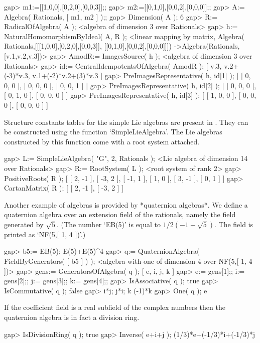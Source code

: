 \beginexample
gap> m1:=[[1,0,0],[0,2,0],[0,0,3]];;
gap> m2:=[[0,1,0],[0,0,2],[0,0,0]];;
gap> A:= Algebra( Rationals, [ m1, m2 ] );;
gap> Dimension( A );
6
\endexample
\beginexample
gap> R:= RadicalOfAlgebra( A );
<algebra of dimension 3 over Rationals>
gap> h:= NaturalHomomorphismByIdeal( A, R );
<linear mapping by matrix, 
  Algebra( Rationals,[[[1,0,0],[0,2,0],[0,0,3]], [[0,1,0],[0,0,2],[0,0,0]]])
  ->Algebra(Rationals,[v.1,v.2,v.3])>
\endexample
\beginexample
gap> AmodR:= ImagesSource( h );
<algebra of dimension 3 over Rationals>
gap> id:= CentralIdempotentsOfAlgebra( AmodR );
[ v.3, v.2+(-3)*v.3, v.1+(-2)*v.2+(3)*v.3 ]
gap> PreImagesRepresentative( h, id[1] );
[ [ 0, 0, 0 ], [ 0, 0, 0 ], [ 0, 0, 1 ] ]
gap> PreImagesRepresentative( h, id[2] );
[ [ 0, 0, 0 ], [ 0, 1, 0 ], [ 0, 0, 0 ] ]
gap> PreImagesRepresentative( h, id[3] );
[ [ 1, 0, 0 ], [ 0, 0, 0 ], [ 0, 0, 0 ] ]
\endexample

Structure constants tables for the simple Lie algebras are present in {\GAP}.
They can be constructed using the function `SimpleLieAlgebra'. The Lie 
algebras constructed by this function come with a root system attached.

\beginexample
gap> L:= SimpleLieAlgebra( "G", 2, Rationals );
<Lie algebra of dimension 14 over Rationals>
gap> R:= RootSystem( L );
<root system of rank 2>
gap> PositiveRoots( R );
[ [ 2, -1 ], [ -3, 2 ], [ -1, 1 ], [ 1, 0 ], [ 3, -1 ], [ 0, 1 ] ]
gap> CartanMatrix( R );
[ [ 2, -1 ], [ -3, 2 ] ]
\endexample

Another example of algebras is provided by *quaternion algebras*.
We define a quaternion algebra over an extension field of the
rationals, namely the field generated by $\sqrt{5}$.
(The number `EB(5)' is equal to $1/2 (-1+\sqrt{5})$.
The field is printed as `NF(5,[ 1, 4 ])'.)

\beginexample
gap> b5:= EB(5);
E(5)+E(5)^4
gap> q:= QuaternionAlgebra( FieldByGenerators( [ b5 ] ) );
<algebra-with-one of dimension 4 over NF(5,[ 1, 4 ])>
gap> gens:= GeneratorsOfAlgebra( q );
[ e, i, j, k ]
gap> e:= gens[1];; i:= gens[2];; j:= gens[3];; k:= gens[4];;
gap> IsAssociative( q );
true
gap> IsCommutative( q );
false
gap> i*j; j*i;
k
(-1)*k
gap> One( q );
e
\endexample

If the coefficient field is a real subfield of the complex numbers
then the quaternion algebra is in fact a division ring.

\beginexample
gap> IsDivisionRing( q );
true
gap> Inverse( e+i+j );
(1/3)*e+(-1/3)*i+(-1/3)*j
\endexample

